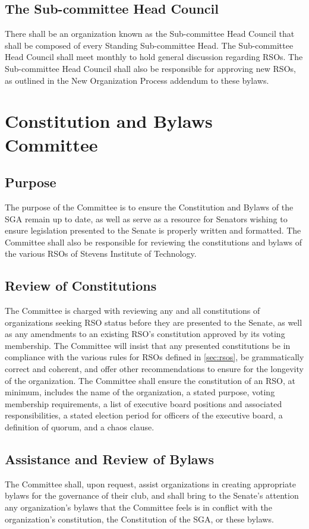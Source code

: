 \documentclass[12pt]{scrreprt}
\begin{document}
\subsection{The Sub-committee Head Council}
There shall be an organization known as the Sub-committee Head Council that shall be composed of every Standing Sub-committee Head. The Sub-committee Head Council shall meet monthly to hold general discussion regarding RSOs. The Sub-committee Head Council shall also be responsible for approving new RSOs, as outlined in the New Organization Process addendum to these bylaws.

\section{Constitution and Bylaws Committee}

\subsection{Purpose}
The purpose of the Committee is to ensure the Constitution and Bylaws of the SGA remain up
to date, as well as serve as a resource for Senators wishing to ensure legislation presented to the Senate is properly written and formatted. The Committee shall also be responsible for reviewing the constitutions and bylaws of the various RSOs of Stevens Institute of Technology.

\subsection{Review of Constitutions}
The Committee is charged with reviewing any and all constitutions of organizations seeking RSO status before they are presented to the Senate, as well as any amendments to an existing RSO’s constitution approved by its voting membership. The Committee will insist that any presented constitutions be in compliance with the various rules for RSOs defined in 
\ref{sec:rsos}, be grammatically correct and coherent, and offer other recommendations to ensure for the longevity of the organization. The Committee shall ensure the constitution of an RSO, at minimum, includes the name of the organization, a stated purpose, voting membership requirements, a list of executive board positions and associated responsibilities, a stated election period for officers of the executive board, a definition of quorum, and a chaos clause.

\subsection{Assistance and Review of Bylaws}
The Committee shall, upon request, assist organizations in creating appropriate bylaws for 
the governance of their club, and shall bring to the Senate's attention any 
organization's bylaws that the Committee feels is in conflict with the 
organization's constitution, the Constitution of the SGA, or these bylaws.
\end{document}
